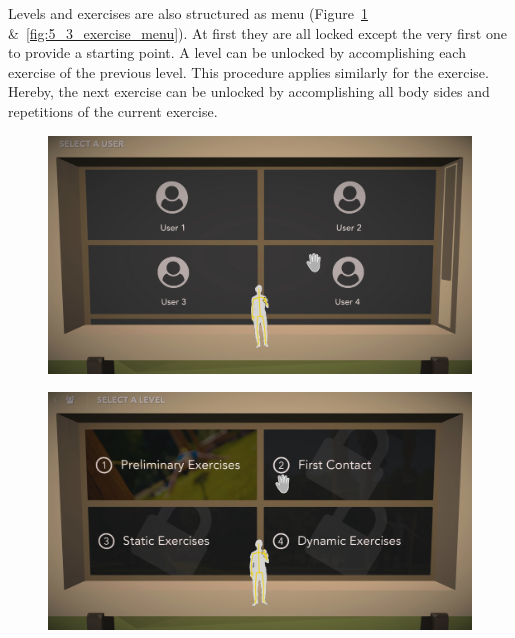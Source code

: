 Levels and exercises are also structured as menu (Figure~\ref{fig:5_3_level_menu} \&~\ref{fig:5_3_exercise_menu}). At first they are all locked except the very first one to provide a starting point. A level can be unlocked by accomplishing each exercise of the previous level. This procedure applies similarly for the exercise. Hereby, the next exercise can be unlocked by accomplishing all body sides and repetitions of the current exercise.
\begin{figure}[htb]
	\centering
	\begin{minipage}[t]{0.32\linewidth}
		\centering
		\includegraphics[width=1\linewidth]{Pictures/5_Workflow/5_UserMenu}
		\label{fig:5_3_user_menu}
	\end{minipage}
	\hfill
	\begin{minipage}[t]{0.32\linewidth}
		\centering
		\includegraphics[width=1\linewidth]{Pictures/5_Workflow/6_LevelMenu}
		\label{fig:5_3_level_menu}

\end{minipage}
\end{figure}
